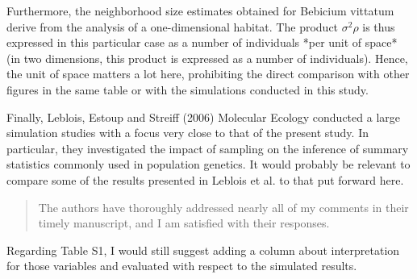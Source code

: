 \begin{point}{}
Furthermore, the neighborhood size estimates obtained for Bebicium vittatum derive from the analysis of a one-dimensional habitat. The product $\sigma^2 \rho$ is thus expressed in this particular case as a number of individuals *per unit of space* (in two dimensions, this product is expressed as a number of individuals). Hence, the unit of space matters a lot here, prohibiting the direct comparison with other figures in the same table or with the simulations conducted in this study.
\end{point}



\begin{point}{}
Finally, Leblois, Estoup and Streiff (2006) Molecular Ecology conducted a large simulation studies with a focus very close to that of the present study. In particular, they investigated the impact of sampling on the inference of summary statistics commonly used in population genetics. It would probably be relevant to compare some of the results presented in Leblois et al. to that put forward here.
\end{point}






\begin{quote}
The authors have thoroughly addressed nearly all of my comments in their timely manuscript, and I am satisfied with their responses.
\end{quote}

\begin{point}{}
Regarding Table S1, I would still suggest adding a column about interpretation for those variables and evaluated with respect to the simulated results.
\end{point}



